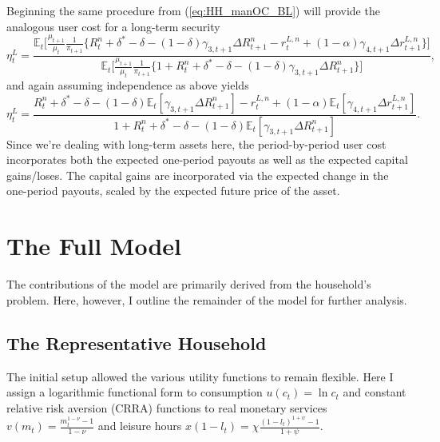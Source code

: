 \documentclass[11pt,a4paper,margin=1.5in]{article}
\begin{document}
Beginning the same procedure from (\ref{eq:HH_manOC_BL}) will provide the analogous user cost for a long-term security
\begin{equation}
\eta^L_t = \frac{\mathbb{E}_t \Big[ \frac{\mu_{t+1}}{\mu_{t}}\frac{1}{\pi_{t+1}} \Big\{ R^n_t + \delta^* - \delta - (1-\delta)\gamma_{3,t+1}\Delta R^n_{t+1} - r^{L,n}_t + (1-\alpha)\gamma_{4,t+1}\Delta r^{L,n}_{t+1}\Big\}\Big]}{\mathbb{E}_t \Big[ \frac{\mu_{t+1}}{\mu_{t}}\frac{1}{\pi_{t+1}} \Big\{ 1+ R^n_t + \delta^* - \delta - (1-\delta)\gamma_{3,t+1}\Delta R^n_{t+1}\Big\}\Big]},
\end{equation}
and again assuming independence as above yields
\begin{equation}
\eta^L_t = \frac{R^n_t + \delta^* - \delta - (1-\delta)\mathbb{E}_t[\gamma_{3,t+1}\Delta R^n_{t+1}] - r^{L,n}_t + (1-\alpha)\mathbb{E}_t[\gamma_{4,t+1}\Delta r^{L,n}_{t+1}]}{1+ R^n_t + \delta^* - \delta - (1-\delta)\mathbb{E}_t[\gamma_{3,t+1}\Delta R^n_{t+1}]}.
\label{eq:usercost_LT}
\end{equation}
Since we're dealing with long-term assets here, the period-by-period user cost incorporates both the expected one-period payouts as well as the expected capital gains/loses.
The capital gains are incorporated via the expected change in the one-period payouts, scaled by the expected future price of the asset.

\newpage
\section{The Full Model}
\label{app:Model}

The contributions of the model are primarily derived from the household's problem.
Here, however, I outline the remainder of the model for further analysis.

\subsection{The Representative Household}
The initial setup allowed the various utility functions to remain flexible.
Here I assign a logarithmic functional form to consumption $u(c_t) = \ln{c_t}$ and constant relative risk aversion (CRRA) functions to real monetary services $v(m_t) = \frac{m_t^{1-\nu} -1}{1-\nu}$ and leisure hours $x(1-l_t) = \chi \frac{(1-l_t)^{1+\psi}-1}{1+\psi}$. 
\end{document}
